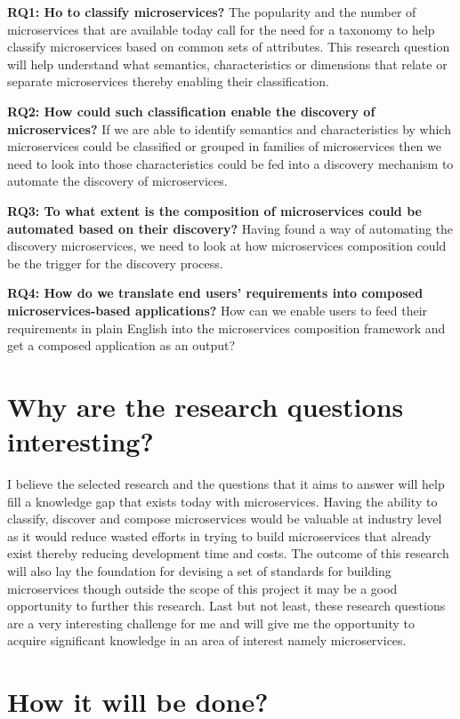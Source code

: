 \documentclass{article}
\begin{document}
\textbf{RQ1: Ho to classify microservices?}
The popularity and the number of microservices that are available today call for the need for a taxonomy to help classify microservices based on common sets of attributes. This research question will help understand what semantics, characteristics or dimensions that relate or separate microservices thereby enabling their classification.

\textbf{RQ2: How could such classification enable the discovery of microservices?}
If we are able to identify semantics and characteristics by which microservices could be classified or grouped in families of microservices then we need to look into those characteristics could be fed into a discovery mechanism to automate the discovery of microservices.

\textbf{RQ3: To what extent is the composition of microservices could be automated based on their discovery?}
Having found a way of automating the discovery microservices, we need to look at how microservices composition could be the trigger for the discovery process.

\textbf{RQ4: How do we translate end users’ requirements into composed microservices-based applications?}
How can we enable users to feed their requirements in plain English into the microservices composition framework and get a composed application as an output? 

\section{Why are the research questions interesting?}

I believe the selected research and the questions that it aims to answer will help fill a knowledge gap that exists today with microservices. Having the ability to classify, discover and compose microservices would be valuable at industry level as it would reduce wasted efforts in trying to build microservices that already exist thereby reducing development time and costs. The outcome of this research will also lay the foundation for devising a set of standards for building microservices though outside the scope of this project it may be a good opportunity to further this research. Last but not least, these research questions are a very interesting challenge for me and will give me the opportunity to acquire significant knowledge in an area of interest namely microservices.

\section{How it will be done?}
\end{document}
